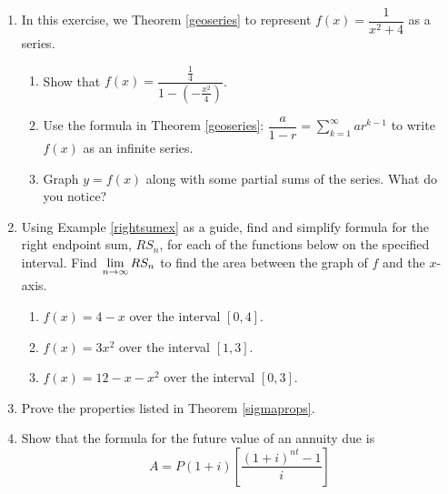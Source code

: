 \documentclass{ximera}
\begin{document}
\begin{enumerate}
\setcounter{enumi}{\value{HW}}

\item\label{seriesforfunctionex}  In this exercise,  we  Theorem \ref{geoseries}  to represent  $f(x) = \dfrac{1}{x^2+4}$ as a series.

\begin{enumerate}

\item  Show that $f(x) = \dfrac{\frac{1}{4}}{1 - \left( -\frac{x^2}{4} \right)}$.

\item  Use the formula  in Theorem \ref{geoseries}: $\dfrac{a}{1-r} = \displaystyle{\sum_{k=1}^{\infty} ar^{k-1}}$ to write $f(x)$ as an infinite series.

\item Graph $y = f(x)$ along with some partial sums of the series.  What do you notice?


\end{enumerate}



\item  Using Example \ref{rightsumex} as a guide, find and simplify  formula for the right endpoint sum, $RS_{n}$, for each of the functions below on the specified interval.  Find $\ds{\lim_{n \rightarrow \infty} RS_{n}}$ to find the area between the graph of $f$ and the $x$-axis.


\begin{enumerate}

\item  $f(x) = 4-x$ over the interval $[0,4]$.   %

\item  $f(x) = 3x^2$ over the interval $[1,3]$.    %

\item  $f(x) = 12-x-x^2$ over the interval $[0,3]$.   %


\end{enumerate}




\item Prove the properties listed in Theorem \ref{sigmaprops}.

\item Show that the formula for the future value of an annuity due is \[A = P(1 + i)\left[\frac{(1 + i)^{nt} - 1}{i}\right]\]


\newpage


\end{enumerate}
\end{document}
